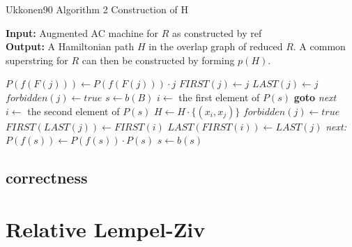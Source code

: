 \documentclass[english,twoside,censored,csm,algorithms-track-2020]{HYthesisML}
\theoremstyle{plain}
\theoremstyle{definition}
\begin{document}
  \begin{algorithm}
    \caption{Ukkonen90 Algorithm 2 Construction of H} \label{ukk-h}
    \hspace*{\algorithmicindent} \textbf{Input:} Augmented AC machine for $R$ as constructed by ref\\ %
    \hspace*{\algorithmicindent} \textbf{Output:} A Hamiltonian path $H$ in the overlap graph of reduced $R$. A common superstring for $R$ can then be constructed by forming $p(H)$.\\

    \begin{algorithmic}[1]
            \State $P(f(F(j)))\gets P(f(F(j)))\cdot {j}$
            \State $FIRST(j)\gets j$
            \State $LAST(j)\gets j$
          \Else
            \State $forbidden(j)\gets true$
          \EndIf
        \EndFor  
        \State $s\gets b(B)$
              \State $i\gets$ the first element of $P(s)$
                  \hspace*{\algorithmicindent} \textbf{goto} \textit{next}
                \Else
                  \State $i\gets$ the second element of $P(s)$
                \EndIf
              \EndIf  
            \State $H\gets H\cdot \{(x_i,x_j)\}$
            \State $forbidden(j)\gets true$
            \State $FIRST(LAST(j))\gets FIRST(i)$
            \State $LAST(FIRST(i))\gets LAST(j)$
            \hspace*{\algorithmicindent} \textit{next:}
            \EndFor
          \State $P(f(s))\gets P(f(s))\cdot P(s)$
          \EndIf
          \State $s\gets b(s)$
        \EndWhile
      \EndFunction
    \end{algorithmic}
  \end{algorithm}
  


  \section{correctness}


\chapter{Relative Lempel-Ziv}
\end{document}
